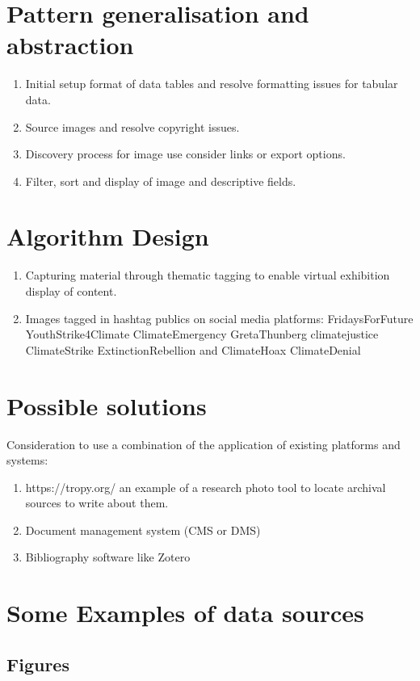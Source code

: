 \documentclass[fleqn,10pt]{olplainarticle}
\begin{document}
\section{Pattern generalisation and abstraction}
\begin{enumerate}
\item Initial setup format of data tables and resolve formatting issues for tabular data.
\item Source images and resolve copyright issues.
\item Discovery process for image use consider links or export options. 
\item Filter, sort and display of image and descriptive fields.
\end{enumerate}

\section {Algorithm Design}
\begin{enumerate}
\item Capturing material through thematic tagging to enable virtual exhibition display of content.
\item Images tagged in hashtag publics on social media platforms: FridaysForFuture YouthStrike4Climate ClimateEmergency GretaThunberg climatejustice ClimateStrike ExtinctionRebellion and ClimateHoax ClimateDenial
\end{enumerate}

\section*{Possible solutions}

Consideration to use a combination of the application of existing platforms and systems:
\begin{enumerate}
    \item https://tropy.org/ an example of a research photo tool to locate archival sources to write about them. 
\item Document management system (CMS or DMS)
\item Bibliography software like Zotero
\end{enumerate}

\section*{Some Examples of data sources}

\subsection*{Figures}
\end{document}
